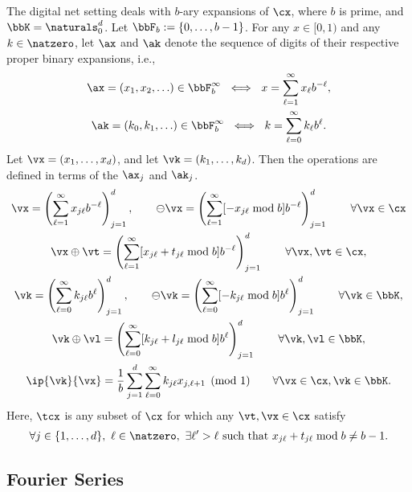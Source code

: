 \documentclass[]{elsarticle}
\theoremstyle{definition}
\begin{document}
The digital net setting deals with $b$-ary expansions of $\cx$, where $b$ is prime, and $\bbK=\naturals_0^d$.  Let $\bbF_b:=\{0, \ldots, b-1\}$.  For any $x \in [0,1)$ and any $k \in \natzero$, let $\ax$ and $\ak$ denote the sequence of digits of their respective proper binary expansions, i.e., 
\begin{gather*}
\ax=(x_1, x_2, \ldots ) \in \bbF_b^\infty \ \iff \ x=\sum_{\ell=1}^\infty x_\ell b^{-\ell}, \\
\ak=(k_0, k_1, \ldots ) \in \bbF_b^\infty \ \iff \ k=\sum_{\ell=0}^\infty k_\ell b^{\ell}.
\end{gather*}
Let $\vx=(x_1, \ldots, x_d)$, and let $\vk=(k_1, \ldots, k_d)$.  Then the operations are defined in terms of the $\ax_j$ and $\ak_j$.
\begin{gather*}
\vx = \left(\sum_{\ell=1}^{\infty} x_{j\ell} b^{-\ell}\right)_{j=1}^d, \qquad \ominus \vx = \left(\sum_{\ell=1}^{\infty} [-x_{j\ell} \bmod b] b^{-\ell}\right)_{j=1}^d \qquad \forall \vx \in \cx  \\ 
\vx \oplus \vt = \left(\sum_{\ell=1}^{\infty} [x_{j\ell} + t_{j\ell} \bmod b] b^{-\ell}\right)_{j=1}^d \qquad \forall \vx, \vt \in \cx, \\
\vk =  \left(\sum_{\ell=0}^{\infty} k_{j\ell} b^{\ell}\right)_{j=1}^d, \qquad \ominus \vk = \left(\sum_{\ell=0}^{\infty} [-k_{j\ell} \bmod b] b^{\ell}\right)_{j=1}^d \qquad \forall \vk \in \bbK, \\
\vk \oplus \vl = \left(\sum_{\ell=0}^{\infty} [k_{j\ell} + l_{j\ell} \bmod b] b^{\ell}\right)_{j=1}^d \qquad \forall \vk, \vl \in \bbK, \\
\ip{\vk}{\vx} = \frac 1b \sum_{j=1}^{d} \sum_{\ell=0}^{\infty} k_{j\ell}x_{j,\ell+1}  \pmod 1 \qquad \forall \vx \in \cx, \vk \in \bbK.
\end{gather*}
Here, $\tcx$ is any subset of $\cx$ for which any $\vt, \vx \in \cx$ satisfy 
\[
\forall j \in \{1, \ldots, d\},\ \ell \in \natzero,\  \exists \ell'>\ell \text{ such that } x_{j\ell} + t_{j\ell} \bmod b \ne b-1.
\]


\subsection{Fourier Series}
\end{document}
